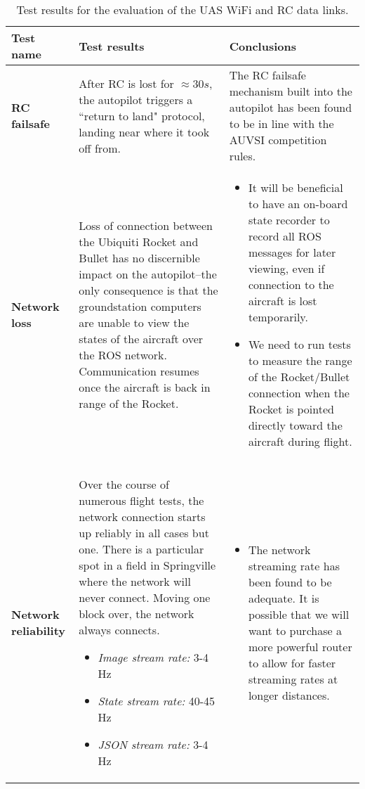 \documentclass[]{auvsi_doc}
\begin{document}
\begin{center}
	\begin{longtable}[H]{|P{3cm}|P{5.75cm}|P{5.75cm}|}
		\caption{Test results for the evaluation of the UAS WiFi and RC data links.}
		\label{tab:ssresults}\\
		\hline
		{\color[HTML]{000000} \textbf{Test name}} & {\color[HTML]{000000}\textbf{Test results}}	& {\color[HTML]{000000}\textbf{Conclusions}} \\
		\hline
		\textbf{RC failsafe}	& After RC is lost for $\approx 30s$, the autopilot triggers a ``return to land" protocol, landing near where it took off from. &	The RC failsafe mechanism built into the autopilot has been found to be in line with the AUVSI competition rules. \\
		\hline
		\textbf{Network loss}	& Loss of connection between the Ubiquiti Rocket and Bullet has no discernible impact on the autopilot--the only consequence is that the groundstation computers are unable to view the states of the aircraft over the ROS network. Communication resumes once the aircraft is back in range of the Rocket. &	\begin{itemize}
			\item It will be beneficial to have an on-board state recorder to record all ROS messages for later viewing, even if connection to the aircraft is lost temporarily.
			\item We need to run tests to measure the range of the Rocket/Bullet connection when the Rocket is pointed directly toward the aircraft during flight.
		\end{itemize} \\
		\hline
		\textbf{Network reliability}	& Over the course of numerous flight tests, the network connection starts up reliably in all cases but one. There is a particular spot in a field in Springville where the network will never connect. Moving one block over, the network always connects. \begin{itemize}
			\item \textit{Image stream rate:} 3-4 Hz
			\item \textit{State stream rate:} 40-45 Hz
			\item \textit{JSON stream rate:} 3-4 Hz
		\end{itemize} &	\begin{itemize}
		\item The network streaming rate has been found to be adequate. It is possible that we will want to purchase a more powerful router to allow for faster streaming rates at longer distances.

\end{itemize}
\end{longtable}
\end{center}
\end{document}
